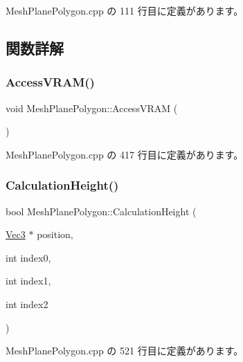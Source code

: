  Mesh\+Plane\+Polygon.\+cpp の 111 行目に定義があります。



\subsection{関数詳解}
\mbox{\label{class_mesh_plane_polygon_a30fd785154d01644ba76165673c5a7ac}} 
\subsubsection{\texorpdfstring{Access\+V\+R\+A\+M()}{AccessVRAM()}}
{\footnotesize\ttfamily void Mesh\+Plane\+Polygon\+::\+Access\+V\+R\+AM (\begin{DoxyParamCaption}{ }\end{DoxyParamCaption})\hspace{0.3cm}{\ttfamily [private]}}



 Mesh\+Plane\+Polygon.\+cpp の 417 行目に定義があります。

\mbox{\label{class_mesh_plane_polygon_a815092659c44ccd2f626445c7dd95c9e}} 
\subsubsection{\texorpdfstring{Calculation\+Height()}{CalculationHeight()}}
{\footnotesize\ttfamily bool Mesh\+Plane\+Polygon\+::\+Calculation\+Height (\begin{DoxyParamCaption}\item[{\mbox{\hyperlink{_vector3_d_8h_ab16f59e4393f29a01ec8b9bbbabbe65d}{Vec3}} $\ast$}]{position,  }\item[{int}]{index0,  }\item[{int}]{index1,  }\item[{int}]{index2 }\end{DoxyParamCaption})\hspace{0.3cm}{\ttfamily [private]}}



 Mesh\+Plane\+Polygon.\+cpp の 521 行目に定義があります。

